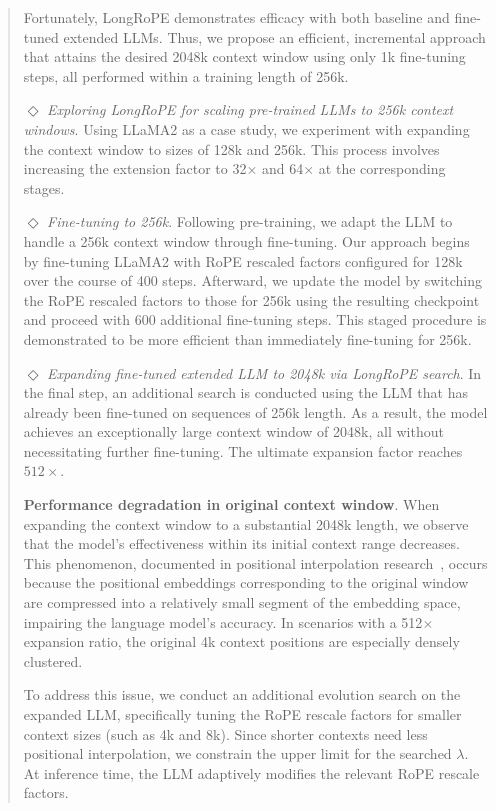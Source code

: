 \begin{abstract}
Fortunately, LongRoPE demonstrates efficacy with both baseline and fine-tuned extended LLMs. Thus, we propose an efficient, incremental approach that attains the desired 2048k context window using only 1k fine-tuning steps, all performed within a training length of 256k.

$\Diamond$ \textit{Exploring LongRoPE for scaling pre-trained LLMs to 256k context windows}. Using LLaMA2 as a case study, we experiment with expanding the context window to sizes of 128k and 256k. This process involves increasing the extension factor to 32$\times$ and 64$\times$ at the corresponding stages.

$\Diamond$ \textit{Fine-tuning to 256k}. Following pre-training, we adapt the LLM to handle a 256k context window through fine-tuning. Our approach begins by fine-tuning LLaMA2 with RoPE rescaled factors configured for 128k over the course of 400 steps. Afterward, we update the model by switching the RoPE rescaled factors to those for 256k using the resulting checkpoint and proceed with 600 additional fine-tuning steps. This staged procedure is demonstrated to be more efficient than immediately fine-tuning for 256k.

$\Diamond$ \textit{Expanding fine-tuned extended LLM to 2048k via LongRoPE search}. In the final step, an additional search is conducted using the LLM that has already been fine-tuned on sequences of 256k length. As a result, the model achieves an exceptionally large context window of 2048k, all without necessitating further fine-tuning. The ultimate expansion factor reaches $512\times$.

\textbf{Performance degradation in original context window}.  When expanding the context window to a substantial 2048k length, we observe that the model's effectiveness within its initial context range decreases. This phenomenon, documented in positional interpolation research~\cite{pi}, occurs because the positional embeddings corresponding to the original window are compressed into a relatively small segment of the embedding space, impairing the language model's accuracy. In scenarios with a 512$\times$ expansion ratio, the original 4k context positions are especially densely clustered.

To address this issue, we conduct an additional evolution search on the expanded LLM, specifically tuning the RoPE rescale factors for smaller context sizes (such as 4k and 8k). Since shorter contexts need less positional interpolation, we constrain the upper limit for the searched $\lambda$. At inference time, the LLM adaptively modifies the relevant RoPE rescale factors.


\end{abstract}
